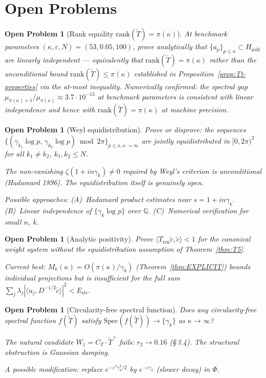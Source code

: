 \documentclass[11pt]{article}
\newtheorem{openproblem}[theorem]{Open Problem}
\newcommand{\Hnull}{H_{\mathrm{null}}}
\newcommand{\Estr}{E_{\mathrm{str}}}
\newcommand{\Tren}{T_{\mathrm{ren}}}
\newcommand{\Tt}{\widetilde{T}}
\newcommand{\CT}{C_{T}}
\newcommand{\Wone}{W_1}
\begin{document}
\section{Open Problems}\label{sec:open-problems}

\begin{openproblem}[Rank equality $\mathrm{rank}(\Tt)=\pi(\kappa)$]\label{op:rank-eq}
At benchmark parameters $(\kappa,\varepsilon,N)=(53,0.05,100)$, prove
analytically that $\{a_p\}_{p\leq\kappa}\subset\Hnull$ are linearly
independent --- equivalently that $\mathrm{rank}(\Tt)=\pi(\kappa)$
rather than the unconditional bound $\mathrm{rank}(\Tt)\leq\pi(\kappa)$
established in Proposition~\ref{prop:Tt-properties} via the at-most
inequality. Numerically confirmed: the spectral gap
$\mu_{\pi(\kappa)+1}/\mu_{\pi(\kappa)}\approx 3.7\cdot 10^{-13}$ at
benchmark parameters is consistent with linear independence and hence
with $\mathrm{rank}(\Tt)=\pi(\kappa)$ at machine precision.
\end{openproblem}

\begin{openproblem}[Weyl equidistribution]\label{op:weyl}
Prove or disprove: the sequences
$\{(\gamma_{k_1}\log p,\,\gamma_{k_2}\log p)\bmod 2\pi\}_{p\leq\kappa,
\kappa\to\infty}$
are jointly equidistributed in $[0,2\pi)^2$
for all $k_1\neq k_2$, $k_1,k_2\leq N$.

The non-vanishing $\zeta(1+in\gamma_k)\neq 0$ required by Weyl's
criterion is unconditional (Hadamard 1896). The equidistribution
itself is genuinely open.

Possible approaches:
(A)~Hadamard product estimates near $s = 1+in\gamma_k$.
(B)~Linear independence of $\{\gamma_k\log p\}$ over $\mathbb{Q}$.
(C)~Numerical verification for small $n$, $k$.
\end{openproblem}

\begin{openproblem}[Analytic positivity]\label{op:pos}
Prove $\langle\Tren\tilde{c},\tilde{c}\rangle < 1$ for the canonical
weight system without the equidistribution assumption of
Theorem~\ref{thm:T5}.

Current best: $M_k(\kappa) = O(\pi(\kappa)/\gamma_k)$
(Theorem~\ref{thm:EXPLICIT}) bounds individual projections but is
insufficient for the full sum
$\sum_j\lambda_j|\langle u_j, D^{-1/2}\tilde{c}\rangle|^2 < \Estr$.
\end{openproblem}

\begin{openproblem}[Circularity-free spectral function]\label{op:hp}
Does any circularity-free spectral function $f(\Tt)$ satisfy
$\mathrm{Spec}(f(\Tt))\to\{\gamma_k\}$ as $\kappa\to\infty$?

The natural candidate $\Wone = \CT\cdot\Tt^+$ fails: $r_2\to 0.16$
(\S\,3.4). The structural obstruction is Gaussian damping.

A possible modification: replace $e^{-\varepsilon^2\gamma_k^2/2}$
by $e^{-\varepsilon\gamma_k}$ (slower decay) in $\Phi$.
\end{openproblem}
\end{document}
